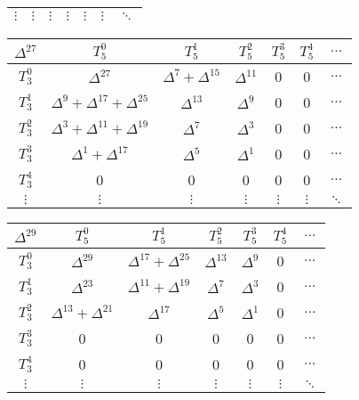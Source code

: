\begin{center}
\begin{tabular}{|c|cccccc|}
	$\vdots$ & $\vdots$ & $\vdots$ & $\vdots$ & $\vdots$ & $\vdots$ & $\ddots$ \\
	\hline
\end{tabular}
\begin{tabular}{|c|cccccc|}
	\hline
	\textbf{$\Delta^{27}$} & \textbf{$T_5^0$} & \textbf{$T_5^1$} & \textbf{$T_5^2$} & \textbf{$T_5^3$} & \textbf{$T_5^4$} & \textbf{$\dots$} \\
	\hline
	$T_3^0$ & $\Delta^{27}$ & $\Delta^7 + \Delta^{15}$ & $\Delta^{11}$ & 0 & 0 & $\dots$ \\
	$T_3^1$ & $\Delta^9 + \Delta^{17} + \Delta^{25}$ & $\Delta^{13}$ & $\Delta^9$ & 0 & 0 & $\dots$ \\
	$T_3^2$ & $\Delta^3 + \Delta^{11} + \Delta^{19}$ & $\Delta^7$ & $\Delta^3$ & 0 & 0 & $\dots$ \\
	$T_3^3$ & $\Delta^1 + \Delta^{17}$ & $\Delta^5$ & $\Delta^1$ & 0 & 0 & $\dots$ \\
	$T_3^4$ & 0 & 0 & 0 & 0 & 0 & $\dots$ \\
	$\vdots$ & $\vdots$ & $\vdots$ & $\vdots$ & $\vdots$ & $\vdots$ & $\ddots$ \\
	\hline
\end{tabular}
\begin{tabular}{|c|cccccc|}
	\hline
	\textbf{$\Delta^{29}$} & \textbf{$T_5^0$} & \textbf{$T_5^1$} & \textbf{$T_5^2$} & \textbf{$T_5^3$} & \textbf{$T_5^4$} & \textbf{$\dots$} \\
	\hline
	$T_3^0$ & $\Delta^{29}$ & $\Delta^{17} + \Delta^{25}$ & $\Delta^{13}$ & $\Delta^9$ & 0 & $\dots$ \\
	$T_3^1$ & $\Delta^{23}$ & $\Delta^{11} + \Delta^{19}$ & $\Delta^7$ & $\Delta^3$ & 0 & $\dots$ \\
	$T_3^2$ & $\Delta^{13} + \Delta^{21}$ & $\Delta^{17}$ & $\Delta^5$ & $\Delta^1$ & 0 & $\dots$ \\
	$T_3^3$ & 0 & 0 & 0 & 0 & 0 & $\dots$ \\
	$T_3^4$ & 0 & 0 & 0 & 0 & 0 & $\dots$ \\
	$\vdots$ & $\vdots$ & $\vdots$ & $\vdots$ & $\vdots$ & $\vdots$ & $\ddots$ \\
	\hline
\end{tabular}

\end{center}
